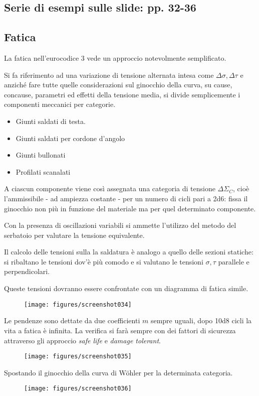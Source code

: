 \documentclass[a4paper, 15pt]{article}
\begin{document}
\subsection{Serie di esempi sulle slide: pp. 32-36}
\subsection{Fatica}
\begin{adjustwidth}{2in}{}	
	La fatica nell'eurocodice 3 vede un approccio notevolmente semplificato. 
	
	Si fa riferimento ad una variazione di tensione alternata intesa come $\Delta\sigma, \Delta\tau$ e anziché fare tutte quelle considerazioni sul ginocchio della curva, su cause, concause, parametri ed effetti della tensione media, si divide semplicemente i componenti meccanici per categorie.  	
	\begin{itemize}
		\item Giunti saldati di testa. 
		\item Giunti saldati per cordone d'angolo
		\item Giunti bullonati 
		\item Profilati scanalati
	\end{itemize} 
	A ciascun componente viene così assegnata una categoria di tensione $\Delta\Sigma_C$, cioè l'ammissibile - ad ampiezza costante - per un numero di cicli pari a \num{2d6}: fissa il ginocchio non più in funzione del materiale ma per quel determinato componente. \newline
	 
	Con la presenza di oscillazioni variabili si ammette l'utilizzo del metodo del serbatoio per valutare la tensione equivalente. \newline
	
	Il calcolo delle tensioni sulla la saldatura è analogo a quello delle sezioni statiche: si ribaltano le tensioni dov'è più comodo e si valutano le tensioni $\sigma, \tau$ parallele e perpendicolari. \newline 
	
	Queste tensioni dovranno essere confrontate con un diagramma di fatica simile.  
	\begin{figure}[H]
		\centering
		\texttt{[image: figures/screenshot034]}
		\label{fig:screenshot034}
	\end{figure}
	Le pendenze sono dettate da due coefficienti $m$ sempre uguali, dopo \num{10d8} cicli la vita a fatica è infinita. 
\newpage
La verifica si farà sempre con dei fattori di sicurezza attraverso gli approccio \textit{safe life} e \textit{damage tolerant}. 
\begin{figure}[H]
	\centering
	\texttt{[image: figures/screenshot035]}
	\label{fig:screenshot035}
\end{figure}
Spostando il ginocchio della curva di Wöhler per la determinata categoria. 
 \begin{figure}[H]
 	\centering
 	\texttt{[image: figures/screenshot036]}
 	\label{fig:screenshot036}
 \end{figure}
    

\end{adjustwidth}
\end{document}

